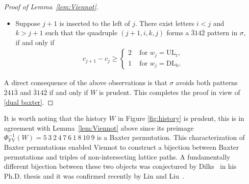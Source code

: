 \documentclass[12pt,reqno]{amsart}
\numberwithin{equation}{section}
\theoremstyle{plain}
\theoremstyle{definition}
\def\FV{\mathrm{FV}}
\def\ULr{\operatorname{UL_r}}
\def\DLb{\operatorname{DL_b}}
\newcommand\varspace[1][.7em]{
  \makebox[#1]{
    \kern.07em
    \vrule height.3ex
    \hrulefill
    \vrule height.3ex
    \kern.07em
  }
}
\begin{document}
\begin{proof}[Proof of Lemma~\ref{lem:Viennot}]
\begin{itemize}
\begin{figure}[!ht]
\begin{center}
    \caption{A scenario that a $\overline{2}14\overline{3}$ pattern is formed when $j$ and $j+1$ are inserted}
    \label{fig:insert}
  \end{center}
\end{figure}

  \item Suppose $j+1$ is inserted to the left of $j$. There exist letters $i<j$ and $k>j+1$ such that the quadruple $(j+1,i,k,j)$ forms a $\overline{3}14\overline{2}$ pattern in $\sigma$, if and only if
  \begin{align*}
    c_{j+1}-c_j\ge
    \begin{cases}
    2 & \text{ for $w_j=\ULr$},\\
    1 & \text{ for $w_j=\DLb$}.
    \end{cases}
  \end{align*}
\end{itemize}
A direct consequence of the above observations is that $\sigma$ avoids both patterns $\overline{2}41\overline{3}$ and $\overline{3}14\overline{2}$ if and only if $W$ is prudent. This completes the proof in view of \eqref{dual baxter}.
\end{proof}

It is worth noting that the history $W$ in Figure \ref{fig:history} is prudent, this is in agreement with Lemma~\ref{lem:Viennot} above since its preimage $\Phi_{\FV}^{-1}(W)=5~3~2~4~7~6~1~8~10~9$ is a Baxter permutation. This characterization of Baxter permutations enabled Viennot to construct a bijection between Baxter permutations and triples of non-intersecting lattice paths. A fundamentally different bijection between these two objects was conjectured by Dilks~\cite[Conjecture 3.5]{Dil15} in his Ph.D. thesis and it was confirmed recently by Lin and Liu~\cite{LL23}.
\end{document}
